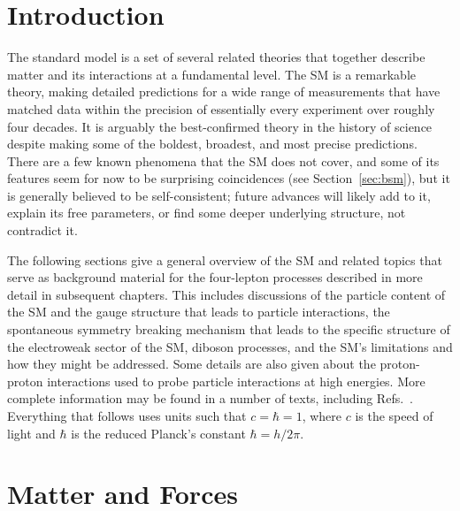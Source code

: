 \section{Introduction}

The standard model is a set of several related theories that together describe matter and its interactions at a fundamental level.
The SM is a remarkable theory, making detailed predictions for a wide range of measurements that have matched data within the precision of essentially every experiment over roughly four decades.
It is arguably the best-confirmed theory in the history of science despite making some of the boldest, broadest, and most precise predictions.
There are a few known phenomena that the SM does not cover, and some of its features seem for now to be surprising coincidences (see Section~\ref{sec:bsm}), but it is generally believed to be self-consistent; future advances will likely add to it, explain its free parameters, or find some deeper underlying structure, not contradict it.

The following sections give a general overview of the SM and related topics that serve as background material for the four-lepton processes described in more detail in subsequent chapters.
This includes discussions of the particle content of the SM and the gauge structure that leads to particle interactions, the spontaneous symmetry breaking mechanism that leads to the specific structure of the electroweak sector of the SM, diboson processes, and the SM's limitations and how they might be addressed.
Some details are also given about the proton-proton interactions used to probe particle interactions at high energies.
More complete information may be found in a number of texts, including Refs.~\cite{Griffiths:111880,Halzen:1984mc,barger1997collider,Peskin:1995ev,Donoghue:238727}.
Everything that follows uses units such that $c = \hbar = 1$, where $c$ is the speed of light and $\hbar$ is the reduced Planck's constant $\hbar = h / 2\pi$.



\section{Matter and Forces}

